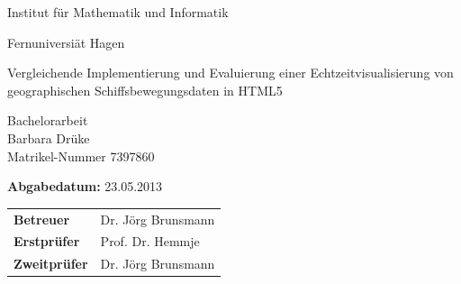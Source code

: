 
\pagestyle{empty}

\clearscrheadings\clearscrplain

\begin{center}
\begin{Huge}
Institut für Mathematik und Informatik\\
\vspace{3mm}
\end{Huge}{\Large Fernuniversiät Hagen}\\

\vspace{28mm}
\begin{Large}
Vergleichende Implementierung und Evaluierung einer Echtzeitvisualisierung von geographischen Schiffsbewegungsdaten in HTML5\\
\end{Large}
\vspace{8mm}
Bachelorarbeit\\
\vspace{0.4cm}
\vspace{5 cm}
Barbara Drüke \\
Matrikel-Nummer 7397860\\
\vspace{3cm}

{\bf Abgabedatum:} 23.05.2013\\
\vspace{3cm}

\begin{tabular}{ll}
{\bf Betreuer} & Dr. Jörg Brunsmann\\
{\bf Erstprüfer}&Prof. Dr. Hemmje\\
{\bf Zweitprüfer}&Dr. Jörg Brunsmann\\
\end{tabular}

\end{center}
\clearpage


\pagestyle{useheadings} %

\tableofcontents
\listoffigures
\listoftables
\lstlistoflistings





